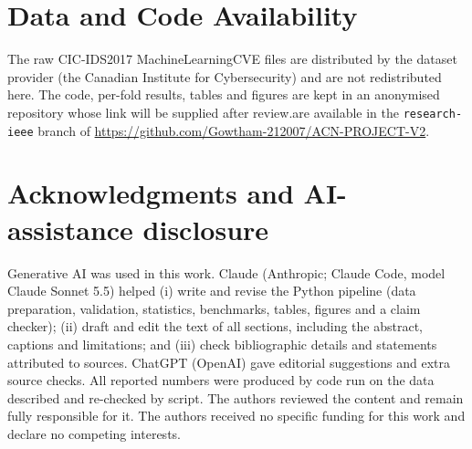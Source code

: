 \documentclass[runningheads]{llncs}
\begin{document}
\section*{Data and Code Availability}
The raw CIC-IDS2017 MachineLearningCVE files are distributed by the dataset provider (the Canadian Institute for Cybersecurity) and are not redistributed here. The code, per-fold results, tables and figures \ifdefined\BLIND are kept in an anonymised repository whose link will be supplied after review.\else are available in the \texttt{research-ieee} branch of \url{https://github.com/Gowtham-212007/ACN-PROJECT-V2}.\fi


\section*{Acknowledgments and AI-assistance disclosure}
Generative AI was used in this work. Claude (Anthropic; Claude Code, model Claude Sonnet 5.5) helped (i) write and revise the Python pipeline (data preparation, validation, statistics, benchmarks, tables, figures and a claim checker); (ii) draft and edit the text of all sections, including the abstract, captions and limitations; and (iii) check bibliographic details and statements attributed to sources. ChatGPT (OpenAI) gave editorial suggestions and extra source checks. All reported numbers were produced by code run on the data described and re-checked by script. The authors reviewed the content and remain fully responsible for it. The authors received no specific funding for this work and declare no competing interests.


{\let\small\footnotesize}
\end{document}
